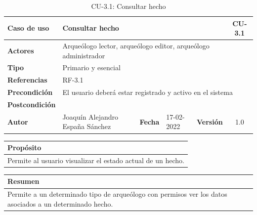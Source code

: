     \begin{table}[H]
    \begin{center}
        \begin{adjustbox}{width=\textwidth}
        \begin{tabular}{ | l | l | l | l | c | c | } 
            \hline
            \textbf{Caso de uso} & \multicolumn{4}{l|}{Consultar hecho} & \cellcolor{gray!50} \textbf{CU-3.1}\\
            \hline
            \textbf{Actores} & \multicolumn{5}{p{0.9\linewidth}|}{Arqueólogo lector, arqueólogo editor, arqueólogo administrador} \\
            \hline
            \textbf{Tipo} & \multicolumn{5}{l|}{Primario y esencial} \\
            \hline
            \textbf{Referencias} & \multicolumn{3}{l|}{RF-3.1} & \multicolumn{2}{l|}{ }\\
            \hline
            \textbf{Precondición} & \multicolumn{5}{l|}{El usuario deberá estar registrado y activo en el sistema} \\
            \hline
            \textbf{Postcondición} & \multicolumn{5}{l|}{ } \\
            \hline
            \textbf{Autor} & \multicolumn{1}{p{0.25\linewidth}|}{Joaquín Alejandro España Sánchez} & \textbf{Fecha} & 
            17-02-2022     & \textbf{Versión}                                                      & 1.0\\
            \hline
        \end{tabular}
        \end{adjustbox}
        \caption{CU-3.1: Consultar hecho}
        \label{tab:consult-fact}
    \end{center}
    \end{table}

    \begin{table}[H]
        \centering
        \begin{tabularx}{\textwidth}{@{} |L |@{}} \hline
            \textbf{Propósito} \\
            \hline
            Permite al usuario visualizar el estado actual de un hecho. \\
            \hline
        \end{tabularx}
    \end{table}

    \begin{table}[H]
        \centering
        \begin{tabularx}{\textwidth}{@{} |L |@{}} \hline
            \textbf{Resumen} \\
            \hline
            Permite a un determinado tipo de arqueólogo con permisos ver los datos asociados
            a un determinado hecho. \\
            \hline
        \end{tabularx}
    \end{table}

